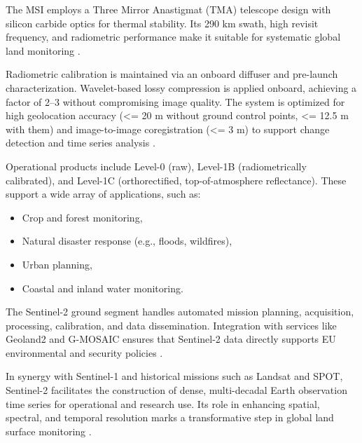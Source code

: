 The MSI employs a Three Mirror Anastigmat (TMA) telescope design with silicon carbide optics for thermal stability. Its 290 km swath, high revisit frequency, and radiometric performance make it suitable for systematic global land monitoring \cite{DRUSCH201225}.

Radiometric calibration is maintained via an onboard diffuser and pre-launch characterization. Wavelet-based lossy compression is applied onboard, achieving a factor of 2–3 without compromising image quality. The system is optimized for high geolocation accuracy (<= 20 m without ground control points, <= 12.5 m with them) and image-to-image coregistration (<= 3 m) to support change detection and time series analysis \cite{DRUSCH201225}.

Operational products include Level-0 (raw), Level-1B (radiometrically calibrated), and Level-1C (orthorectified, top-of-atmosphere reflectance). These support a wide array of applications, such as:
\begin{itemize}
    \item Crop and forest monitoring,
    \item Natural disaster response (e.g., floods, wildfires),
    \item Urban planning,
    \item Coastal and inland water monitoring.
\end{itemize}

The Sentinel-2 ground segment handles automated mission planning, acquisition, processing, calibration, and data dissemination. Integration with services like Geoland2 and G-MOSAIC ensures that Sentinel-2 data directly supports EU environmental and security policies \cite{DRUSCH201225}.

In synergy with Sentinel-1 and historical missions such as Landsat and SPOT, Sentinel-2 facilitates the construction of dense, multi-decadal Earth observation time series for operational and research use. Its role in enhancing spatial, spectral, and temporal resolution marks a transformative step in global land surface monitoring \cite{DRUSCH201225}.